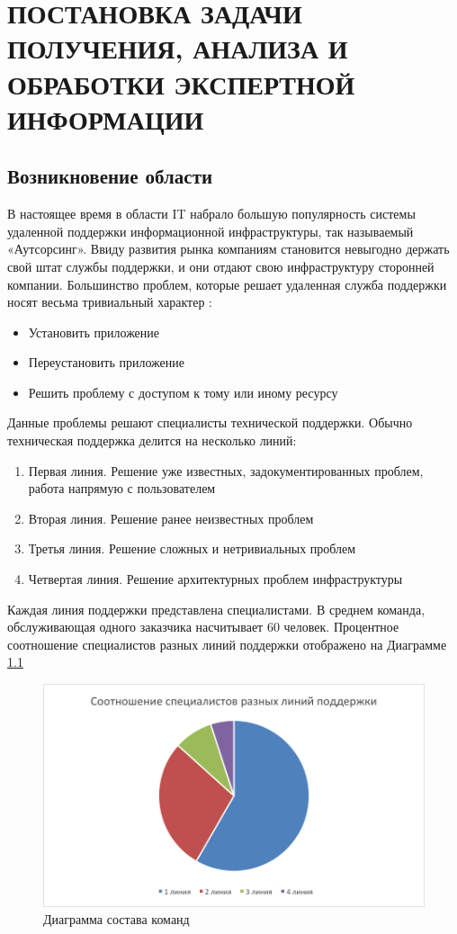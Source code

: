 \chapter{ПОСТАНОВКА ЗАДАЧИ ПОЛУЧЕНИЯ, АНАЛИЗА И ОБРАБОТКИ ЭКСПЕРТНОЙ ИНФОРМАЦИИ} \label{chapt1}

\section{Возникновение области} \label{sect1_1}
В настоящее время в области IT набрало большую популярность системы удаленной поддержки информационной инфраструктуры, так называемый «Аутсорсинг». Ввиду развития рынка компаниям становится невыгодно держать свой штат службы поддержки, и они отдают свою инфраструктуру сторонней компании.
Большинство проблем, которые решает удаленная служба поддержки носят весьма тривиальный характер :
\begin{itemize}
	\item Установить приложение
	\item Переустановить приложение
	\item Решить проблему с доступом к тому или иному ресурсу
\end{itemize}
Данные проблемы решают специалисты технической поддержки. Обычно техническая поддержка делится на несколько линий:
\begin{enumerate}
	\item Первая линия. Решение уже известных, задокументированных проблем, работа напрямую с пользователем
	\item Вторая линия. Решение ранее неизвестных проблем
	\item Третья линия. Решение сложных и нетривиальных проблем
	\item Четвертая линия. Решение архитектурных проблем инфраструктуры
\end{enumerate}

Каждая линия поддержки представлена специалистами. В среднем команда, обслуживающая одного заказчика насчитывает 60 человек. Процентное соотношение специалистов разных линий поддержки отображено на Диаграмме \ref{img:ITSMTeamComposition}

\begin{figure} [h] 
  \center
  \includegraphics [scale=0.7] {ITSMTeamComposition}
  \caption{Диаграмма состава команд} 
  \label{img:ITSMTeamComposition}  
\end{figure}


